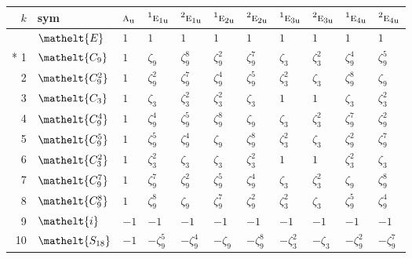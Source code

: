 \documentclass[10pt,a4paper]{article}
\numberwithin{equation}{section}
\newcommand{\eltfont}[1]{{\let\sigma\eltsigma\mathelt{#1}}}
\newcommand{\irr}[1]{\text{\normalfont\scshape #1}}
\newcommand{\conjpair}[1]{{}^{#1}}
\newcommand{\cls}[1]{\eltfont{#1}}
\newcommand{\ptag}[1]{\mathrm{#1}}
\newcommand{\rootunity}[1]{\zeta_{#1}}
\begin{document}
{\small\setlength{\tabcolsep}{4pt}
\begin{longtable}{@{}rllllllllll@{}}\toprule
$k$ & sym & $\irr{a}_{\ptag{u}}$ & $\conjpair{1}\irr{e}_{1\ptag{u}}$ & $\conjpair{2}\irr{e}_{1\ptag{u}}$ & $\conjpair{1}\irr{e}_{2\ptag{u}}$ & $\conjpair{2}\irr{e}_{2\ptag{u}}$ & $\conjpair{1}\irr{e}_{3\ptag{u}}$ & $\conjpair{2}\irr{e}_{3\ptag{u}}$ & $\conjpair{1}\irr{e}_{4\ptag{u}}$ & $\conjpair{2}\irr{e}_{4\ptag{u}}$\\\midrule\endhead
\bottomrule\endfoot\endlastfoot
0 & $\cls{E}$ & $1$ & $1$ & $1$ & $1$ & $1$ & $1$ & $1$ & $1$ & $1$\\*
1 & $\cls{C_{9}}$ & $1$ & $\rootunity{9}$ & $\rootunity{9}^{8}$ & $\rootunity{9}^{2}$ & $\rootunity{9}^{7}$ & $\rootunity{3}$ & $\rootunity{3}^{2}$ & $\rootunity{9}^{4}$ & $\rootunity{9}^{5}$\\
2 & $\cls{C_{9}^{2}}$ & $1$ & $\rootunity{9}^{2}$ & $\rootunity{9}^{7}$ & $\rootunity{9}^{4}$ & $\rootunity{9}^{5}$ & $\rootunity{3}^{2}$ & $\rootunity{3}$ & $\rootunity{9}^{8}$ & $\rootunity{9}$\\
3 & $\cls{C_{3}}$ & $1$ & $\rootunity{3}$ & $\rootunity{3}^{2}$ & $\rootunity{3}^{2}$ & $\rootunity{3}$ & $1$ & $1$ & $\rootunity{3}$ & $\rootunity{3}^{2}$\\
4 & $\cls{C_{9}^{4}}$ & $1$ & $\rootunity{9}^{4}$ & $\rootunity{9}^{5}$ & $\rootunity{9}^{8}$ & $\rootunity{9}$ & $\rootunity{3}$ & $\rootunity{3}^{2}$ & $\rootunity{9}^{7}$ & $\rootunity{9}^{2}$\\
5 & $\cls{C_{9}^{5}}$ & $1$ & $\rootunity{9}^{5}$ & $\rootunity{9}^{4}$ & $\rootunity{9}$ & $\rootunity{9}^{8}$ & $\rootunity{3}^{2}$ & $\rootunity{3}$ & $\rootunity{9}^{2}$ & $\rootunity{9}^{7}$\\
6 & $\cls{C_{3}^{2}}$ & $1$ & $\rootunity{3}^{2}$ & $\rootunity{3}$ & $\rootunity{3}$ & $\rootunity{3}^{2}$ & $1$ & $1$ & $\rootunity{3}^{2}$ & $\rootunity{3}$\\
7 & $\cls{C_{9}^{7}}$ & $1$ & $\rootunity{9}^{7}$ & $\rootunity{9}^{2}$ & $\rootunity{9}^{5}$ & $\rootunity{9}^{4}$ & $\rootunity{3}$ & $\rootunity{3}^{2}$ & $\rootunity{9}$ & $\rootunity{9}^{8}$\\
8 & $\cls{C_{9}^{8}}$ & $1$ & $\rootunity{9}^{8}$ & $\rootunity{9}$ & $\rootunity{9}^{7}$ & $\rootunity{9}^{2}$ & $\rootunity{3}^{2}$ & $\rootunity{3}$ & $\rootunity{9}^{5}$ & $\rootunity{9}^{4}$\\
9 & $\cls{i}$ & $-1$ & $-1$ & $-1$ & $-1$ & $-1$ & $-1$ & $-1$ & $-1$ & $-1$\\
10 & $\cls{S_{18}}$ & $-1$ & $-\rootunity{9}^{5}$ & $-\rootunity{9}^{4}$ & $-\rootunity{9}$ & $-\rootunity{9}^{8}$ & $-\rootunity{3}^{2}$ & $-\rootunity{3}$ & $-\rootunity{9}^{2}$ & $-\rootunity{9}^{7}$\\

\end{longtable}}
\end{document}
